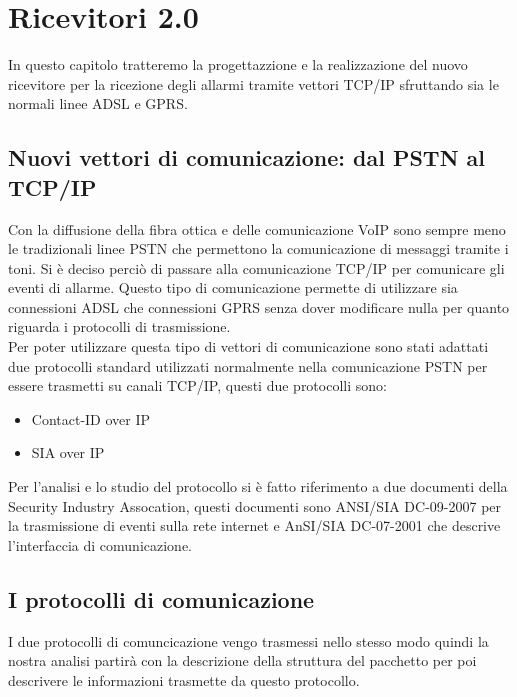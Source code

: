 \chapter{Ricevitori 2.0}
\label{capitolo4}
\thispagestyle{empty}
In questo capitolo tratteremo la progettazzione e la realizzazione del nuovo  ricevitore per la ricezione degli allarmi tramite vettori TCP/IP sfruttando sia le normali linee ADSL e GPRS.
\section{Nuovi vettori di comunicazione: dal PSTN al TCP/IP}
Con la diffusione della fibra ottica e delle comunicazione VoIP sono sempre meno le tradizionali linee PSTN che permettono la comunicazione di messaggi tramite i toni. Si è deciso perciò di passare alla comunicazione TCP/IP per comunicare gli eventi di allarme. Questo tipo di comunicazione permette di utilizzare sia connessioni ADSL che connessioni GPRS senza dover modificare nulla per quanto riguarda i protocolli di trasmissione.\\
Per poter utilizzare questa tipo di vettori di comunicazione sono stati adattati due protocolli standard utilizzati normalmente nella comunicazione PSTN per essere trasmetti su canali TCP/IP, questi due protocolli sono:
\begin{itemize}
	\item Contact-ID over IP
	\item SIA over IP
\end{itemize}
Per l'analisi e lo studio del protocollo si è fatto riferimento a due documenti della Security Industry Assocation, questi documenti sono ANSI/SIA DC-09-2007 per la trasmissione di eventi sulla rete internet e AnSI/SIA DC-07-2001 che descrive l'interfaccia di comunicazione.
\section{I protocolli di comunicazione}
I due protocolli di comuncicazione vengo trasmessi nello stesso modo quindi la nostra analisi partirà con la descrizione della struttura del pacchetto per poi descrivere le informazioni trasmette da questo protocollo.

